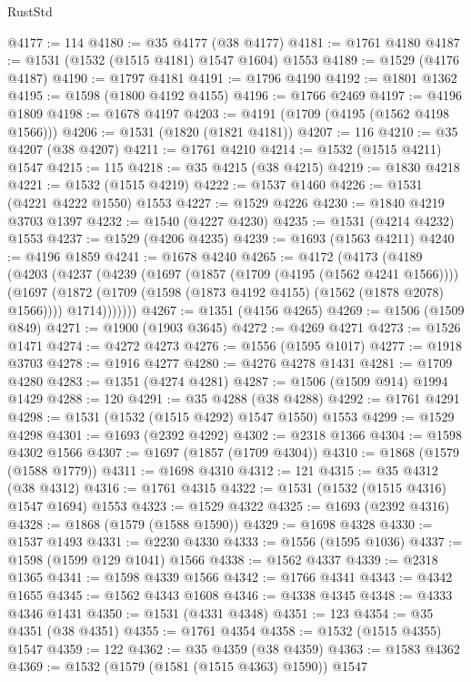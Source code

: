 \begin{lexlean}{RustStd}
\begin{coremodule}
{\begin{coremodule}
{{{{{{{{{{{{{{{{{{{{{{{{{{{{{{{{@4177 := 114
@4180 := @35 @4177 (@38 @4177)
@4181 := @1761 @4180
@4187 := @1531 (@1532 (@1515 @4181) @1547 @1604) @1553
@4189 := @1529 (@4176 @4187)
@4190 := @1797 @4181
@4191 := @1796 @4190
@4192 := @1801 @1362
@4195 := @1598 (@1800 @4192 @4155)
@4196 := @1766 @2469
@4197 := @4196 @1809
@4198 := @1678 @4197
@4203 := @4191 (@1709 (@4195 (@1562 @4198 @1566)))
@4206 := @1531 (@1820 (@1821 @4181))
@4207 := 116
@4210 := @35 @4207 (@38 @4207)
@4211 := @1761 @4210
@4214 := @1532 (@1515 @4211) @1547
@4215 := 115
@4218 := @35 @4215 (@38 @4215)
@4219 := @1830 @4218
@4221 := @1532 (@1515 @4219)
@4222 := @1537 @1460
@4226 := @1531 (@4221 @4222 @1550) @1553
@4227 := @1529 @4226
@4230 := @1840 @4219 @3703 @1397
@4232 := @1540 (@4227 @4230)
@4235 := @1531 (@4214 @4232) @1553
@4237 := @1529 (@4206 @4235)
@4239 := @1693 (@1563 @4211)
@4240 := @4196 @1859
@4241 := @1678 @4240
@4265 := @4172
    (@4173
      (@4189
        (@4203
          (@4237
            (@4239
              (@1697
                (@1857 (@1709 (@4195 (@1562 @4241 @1566))))
                (@1697
                  (@1872 (@1709 (@1598 (@1873 @4192 @4155) (@1562 (@1878 @2078) @1566))))
                  @1714)))))))
@4267 := @1351 (@4156 @4265)
@4269 := @1506 (@1509 @849)
@4271 := @1900 (@1903 @3645)
@4272 := @4269 @4271
@4273 := @1526 @1471
@4274 := @4272 @4273
@4276 := @1556 (@1595 @1017)
@4277 := @1918 @3703
@4278 := @1916 @4277
@4280 := @4276 @4278 @1431
@4281 := @1709 @4280
@4283 := @1351 (@4274 @4281)
@4287 := @1506 (@1509 @914) @1994 @1429
@4288 := 120
@4291 := @35 @4288 (@38 @4288)
@4292 := @1761 @4291
@4298 := @1531 (@1532 (@1515 @4292) @1547 @1550) @1553
@4299 := @1529 @4298
@4301 := @1693 (@2392 @4292)
@4302 := @2318 @1366
@4304 := @1598 @4302 @1566
@4307 := @1697 (@1857 (@1709 @4304))
@4310 := @1868 (@1579 (@1588 @1779))
@4311 := @1698 @4310
@4312 := 121
@4315 := @35 @4312 (@38 @4312)
@4316 := @1761 @4315
@4322 := @1531 (@1532 (@1515 @4316) @1547 @1694) @1553
@4323 := @1529 @4322
@4325 := @1693 (@2392 @4316)
@4328 := @1868 (@1579 (@1588 @1590))
@4329 := @1698 @4328
@4330 := @1537 @1493
@4331 := @2230 @4330
@4333 := @1556 (@1595 @1036)
@4337 := @1598 (@1599 @129 @1041) @1566
@4338 := @1562 @4337
@4339 := @2318 @1365
@4341 := @1598 @4339 @1566
@4342 := @1766 @4341
@4343 := @4342 @1655
@4345 := @1562 @4343 @1608
@4346 := @4338 @4345
@4348 := @4333 @4346 @1431
@4350 := @1531 (@4331 @4348)
@4351 := 123
@4354 := @35 @4351 (@38 @4351)
@4355 := @1761 @4354
@4358 := @1532 (@1515 @4355) @1547
@4359 := 122
@4362 := @35 @4359 (@38 @4359)
@4363 := @1583 @4362
@4369 := @1532 (@1579 (@1581 (@1515 @4363) @1590)) @1547
}}}}}}}}}}}}}}}}}}}}}}}}}}}}}}}}
\end{coremodule}}
\end{coremodule}
\end{lexlean}
